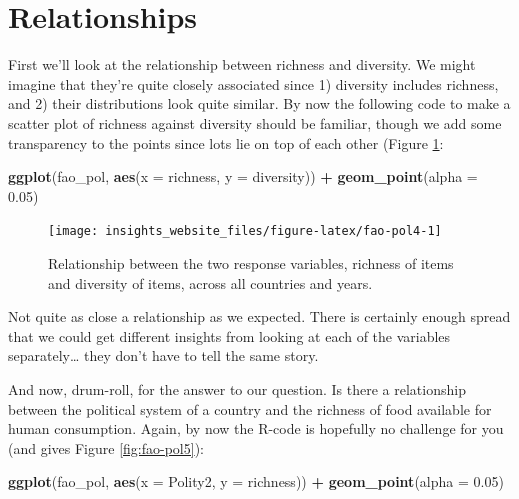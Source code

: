 \documentclass[]{book}
\newenvironment{Shaded}{\begin{snugshade}}{\end{snugshade}}
\newcommand{\DataTypeTok}[1]{\textcolor[rgb]{0.13,0.29,0.53}{#1}}
\newcommand{\FloatTok}[1]{\textcolor[rgb]{0.00,0.00,0.81}{#1}}
\newcommand{\KeywordTok}[1]{\textcolor[rgb]{0.13,0.29,0.53}{\textbf{#1}}}
\newcommand{\NormalTok}[1]{#1}
\newcommand{\OperatorTok}[1]{\textcolor[rgb]{0.81,0.36,0.00}{\textbf{#1}}}
\newcommand{\StringTok}[1]{\textcolor[rgb]{0.31,0.60,0.02}{#1}}
\begin{document}
\hypertarget{relationships}{%
\section{Relationships}\label{relationships}}

First we'll look at the relationship between richness and diversity. We might imagine that they're quite closely associated since 1) diversity includes richness, and 2) their distributions look quite similar. By now the following code to make a scatter plot of richness against diversity should be familiar, though we add some transparency to the points since lots lie on top of each other (Figure \ref{fig:fao-pol4}:

\begin{Shaded}
\begin{Highlighting}[]
\KeywordTok{ggplot}\NormalTok{(fao_pol, }\KeywordTok{aes}\NormalTok{(}\DataTypeTok{x =}\NormalTok{ richness, }\DataTypeTok{y =}\NormalTok{ diversity)) }\OperatorTok{+}
\StringTok{  }\KeywordTok{geom_point}\NormalTok{(}\DataTypeTok{alpha =} \FloatTok{0.05}\NormalTok{)}
\end{Highlighting}
\end{Shaded}

\begin{figure}

{\centering \texttt{[image: insights\_website\_files/figure-latex/fao-pol4-1]} 

}

\caption{Relationship between the two response variables, richness of items and diversity of items, across all countries and years.}\label{fig:fao-pol4}
\end{figure}

Not quite as close a relationship as we expected. There is certainly enough spread that we could get different insights from looking at each of the variables separately\ldots{} they don't have to tell the same story.

And now, drum-roll, for the answer to our question. Is there a relationship between the political system of a country and the richness of food available for human consumption. Again, by now the R-code is hopefully no challenge for you (and gives Figure \ref{fig:fao-pol5}):

\begin{Shaded}
\begin{Highlighting}[]
\KeywordTok{ggplot}\NormalTok{(fao_pol, }\KeywordTok{aes}\NormalTok{(}\DataTypeTok{x =}\NormalTok{ Polity2, }\DataTypeTok{y =}\NormalTok{ richness)) }\OperatorTok{+}
\StringTok{  }\KeywordTok{geom_point}\NormalTok{(}\DataTypeTok{alpha =} \FloatTok{0.05}\NormalTok{)}
\end{Highlighting}
\end{Shaded}
\end{document}
